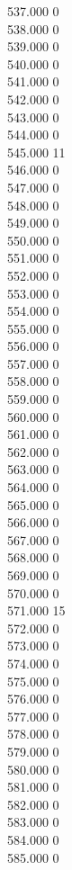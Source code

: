 { 537.000	0 \\
 538.000	0 \\
 539.000	0 \\
 540.000	0 \\
 541.000	0 \\
 542.000	0 \\
 543.000	0 \\
 544.000	0 \\
 545.000	11 \\
 546.000	0 \\
 547.000	0 \\
 548.000	0 \\
 549.000	0 \\
 550.000	0 \\
 551.000	0 \\
 552.000	0 \\
 553.000	0 \\
 554.000	0 \\
 555.000	0 \\
 556.000	0 \\
 557.000	0 \\
 558.000	0 \\
 559.000	0 \\
 560.000	0 \\
 561.000	0 \\
 562.000	0 \\
 563.000	0 \\
 564.000	0 \\
 565.000	0 \\
 566.000	0 \\
 567.000	0 \\
 568.000	0 \\
 569.000	0 \\
 570.000	0 \\
 571.000	15 \\
 572.000	0 \\
 573.000	0 \\
 574.000	0 \\
 575.000	0 \\
 576.000	0 \\
 577.000	0 \\
 578.000	0 \\
 579.000	0 \\
 580.000	0 \\
 581.000	0 \\
 582.000	0 \\
 583.000	0 \\
 584.000	0 \\
 585.000	0 \\
}
